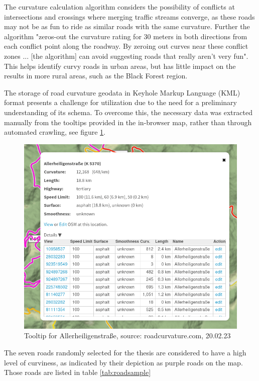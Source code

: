 The curvature calculation algorithm considers the possibility of conflicts at intersections and crossings where merging traffic streams converge, as these roads may not be as fun to ride as similar roads with the same curvature. Further the algorithm "zeros-out the curvature rating for 30 meters in both directions from each conflict point along the roadway. By zeroing out curves near these conflict zones ... [the algorithm] can avoid suggesting roads that really aren't very fun\cite{roadcurvature.com}". This helps identify curvy roads in urban areas, but has little impact on the results in more rural areas, such as the Black Forest region.

The storage of road curvature geodata in Keyhole Markup Language (KML) format presents a challenge for utilization due to the need for a preliminary understanding of its schema. To overcome this, the necessary data was extracted manually from the tooltips provided in the in-browser map, rather than through automated crawling, see figure \ref{fig:tooltip}.

\begin{figure}
    \centering
    \includegraphics[width=0.8\linewidth]{images/tooltip.png}
    \caption{Tooltip for Allerheiligenstraße, source: roadcurvature.com, 20.02.23}
    \label{fig:tooltip}
\end{figure}

The seven roads randomly selected for the thesis are considered to have a high level of curviness, as indicated by their depiction as purple roads on the map. Those roads are listed in table \ref{tab:roadsample}

